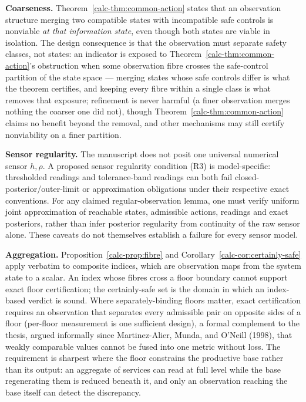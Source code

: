 \documentclass[10pt,twocolumn]{article}
\theoremstyle{definition}
\begin{document}
\textbf{Coarseness.} Theorem~\ref{calc-thm:common-action} states that an observation structure
merging two compatible states with incompatible safe controls is
nonviable \emph{at that information state}, even though both states are
viable in isolation. The design consequence is that the observation must
separate safety classes, not states: an indicator is exposed to Theorem~\ref{calc-thm:common-action}'s obstruction when some observation fibre crosses the safe-control
partition of the state space --- merging states whose safe controls differ is what the theorem certifies, and keeping every fibre within a single class is what removes that exposure; refinement is never harmful (a finer observation merges nothing the coarser one did not), though Theorem~\ref{calc-thm:common-action}
claims no benefit beyond the removal, and other mechanisms may still
certify nonviability on a finer partition.

\textbf{Sensor regularity.} The manuscript does not posit one universal numerical sensor \(h,\rho\). A proposed sensor regularity condition (R3) is model-specific: thresholded readings and tolerance-band readings can both fail closed-posterior/outer-limit or approximation obligations under their respective exact conventions. For any claimed regular-observation lemma, one must verify uniform joint approximation of reachable states, admissible actions, readings and exact posteriors, rather than infer posterior regularity from continuity of the raw sensor alone. These caveats do not themselves establish a failure for every sensor model.

\textbf{Aggregation.} Proposition~\ref{calc-prop:fibre} and Corollary~\ref{calc-cor:certainly-safe} apply verbatim to
composite indices, which are observation maps from the system state to a
scalar. An index whose fibres cross a floor boundary cannot support
exact floor certification; the certainly-safe set is the domain in which an index-based verdict is sound. Where separately-binding floors matter, exact
certification requires an observation that separates every admissible
pair on opposite sides of a floor (per-floor measurement is one sufficient design), a formal complement to the thesis, argued informally since Martinez-Alier, Munda, and O'Neill (1998), that weakly comparable
values cannot be fused into one metric without loss. The requirement is
sharpest where the floor constrains the productive base rather than its
output: an aggregate of services can read at full level while the base
regenerating them is reduced beneath it, and only an observation
reaching the base itself can detect the discrepancy.
\end{document}
